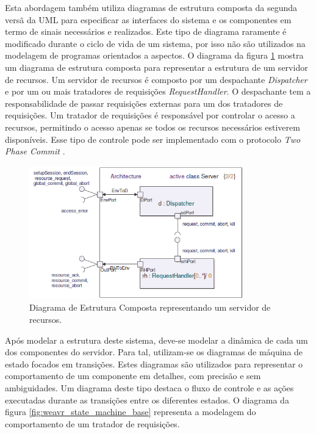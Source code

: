 Esta abordagem também utiliza diagramas de estrutura composta da segunda versã da UML para especificar as interfaces do sistema e os componentes em
termo de sinais necessários e realizados. Este tipo de diagrama raramente é modificado durante o ciclo de vida de um sistema, por isso não são
utilizados na modelagem de programas orientados a aspectos. O diagrama da figura \ref{fig:weavr_composite_structure} mostra um diagrama de estrutura
composta para representar a estrutura de um servidor de recursos. Um servidor de recursos é composto por um despachante \textit{Dispatcher} e por um
ou mais tratadores de requisições \textit{RequestHandler}. O despachante tem a responsabilidade de passar requisições externas para um dos tratadores
de requisições. Um tratador de requisições é responsável por controlar o acesso a recursos, permitindo o acesso apenas se todos os recursos
necessários estiverem disponíveis. Esse tipo de controle pode ser implementado com o protocolo \textit{Two Phase Commit} .

\begin{figure}
	\centering
	\includegraphics[width=350px]{img/weavr_composite_structure.png}
	\caption{Diagrama de Estrutura Composta
	representando um servidor de recursos.}\label{fig:weavr_composite_structure}
\end{figure}

Após modelar a estrutura deste sistema, deve-se modelar a dinâmica de cada um dos componentes do servidor. Para tal, utilizam-se os diagramas de
máquina de estado focados em transições. Estes diagramas são utilizados para representar o comportamento de um componente em detalhes, com precisão e
sem ambiguidades. Um diagrama deste tipo destaca o fluxo de controle e as ações executadas durante as transições entre os diferentes estados. O
diagrama da figura \ref{fig:weavr_state_machine_base} representa a modelagem do comportamento de um tratador de requisições.

